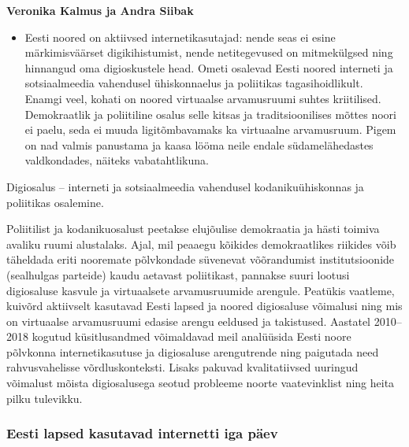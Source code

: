 \documentclass[estonian,]{article}
\providecommand{\tightlist}{%
  \setlength{\itemsep}{0pt}\setlength{\parskip}{0pt}}
\begin{document}
\begin{authors}
\textbf{Veronika Kalmus ja Andra Siibak}
\end{authors}

\begin{points}
\begin{itemize}
\tightlist
\item
  Eesti noored on aktiivsed internetikasutajad: nende seas ei esine
  märkimisväärset digikihistumist, nende netitegevused on mitmekülgsed
  ning hinnangud oma digioskustele head. Ometi osalevad Eesti noored
  interneti ja sotsiaalmeedia vahendusel ühiskonnaelus ja poliitikas
  tagasihoidlikult. Enamgi veel, kohati on noored virtuaalse
  arvamusruumi suhtes kriitilised. Demokraatlik ja poliitiline osalus
  selle kitsas ja traditsioonilises mõttes noori ei paelu, seda ei muuda
  ligitõmbavamaks ka virtuaalne arvamusruum. Pigem on nad valmis
  panustama ja kaasa lööma neile endale südamelähedastes valdkondades,
  näiteks vabatahtlikuna.
\end{itemize}
\end{points}

\begin{blockquote-right}
Digiosalus -- interneti ja sotsiaalmeedia vahendusel kodanikuühiskonnas
ja poliitikas osalemine.
\end{blockquote-right}

Poliitilist ja kodanikuosalust peetakse elujõulise demokraatia ja hästi toimiva avaliku ruumi alustalaks. Ajal, mil peaaegu kõikides demokraatlikes riikides võib täheldada eriti nooremate põlvkondade süvenevat võõrandumist institutsioonide (sealhulgas parteide) kaudu aetavast poliitikast, pannakse suuri lootusi digiosaluse kasvule ja virtuaalsete arvamusruumide arengule. Peatükis vaatleme, kuivõrd aktiivselt kasutavad Eesti lapsed ja noored digiosaluse võimalusi ning mis on virtuaalse arvamusruumi edasise arengu eeldused ja takistused. Aastatel 2010--2018 kogutud küsitlusandmed võimaldavad meil analüüsida Eesti noore põlvkonna internetikasutuse ja digiosaluse arengutrende ning paigutada need rahvusvahelisse võrdluskonteksti. Lisaks pakuvad kvalitatiivsed uuringud võimalust mõista digiosalusega seotud probleeme noorte vaatevinklist ning heita pilku tulevikku.

\hypertarget{eesti-lapsed-kasutavad-internetti-iga-puxe4ev}{%
\subsubsection*{Eesti lapsed kasutavad internetti iga päev}\label{eesti-lapsed-kasutavad-internetti-iga-puxe4ev}}
\end{document}
